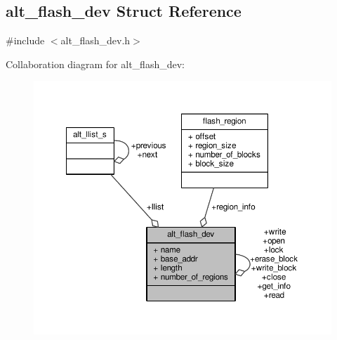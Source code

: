 \subsection{alt\+\_\+flash\+\_\+dev Struct Reference}
\label{structalt__flash__dev}


{\ttfamily \#include $<$alt\+\_\+flash\+\_\+dev.\+h$>$}



Collaboration diagram for alt\+\_\+flash\+\_\+dev\+:
\nopagebreak
\begin{figure}[H]
\begin{center}
\leavevmode
\includegraphics[width=350pt]{dd/dd6/structalt__flash__dev__coll__graph}
\end{center}
\end{figure}

